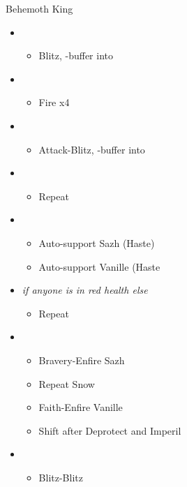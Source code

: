 \begin{battle}{Behemoth King}
\begin{itemize}
    \item \second
    \begin{itemize}
        \item Blitz, \rav-buffer into
    \end{itemize}
    \item \sixth
    \begin{itemize}
        \item Fire x4
    \end{itemize}
    \item \first
    \begin{itemize}
        \item Attack-Blitz, \rav-buffer into
    \end{itemize}
    \item \sixth
    \begin{itemize}
        \item Repeat
    \end{itemize}
    \item \fourth
    \begin{itemize}
        \item Auto-support Sazh (Haste)
        \item Auto-support Vanille (Haste
    \end{itemize}
    \item \fifth \textit{if anyone is in red health else} \sixth
    \begin{itemize}
        \item Repeat
    \end{itemize}
    \item \third
    \begin{itemize}
        \item Bravery-Enfire Sazh
        \item Repeat Snow
        \item Faith-Enfire Vanille
        \item Shift after Deprotect and Imperil
    \end{itemize}
    \item \second
    \begin{itemize}
        \item Blitz-Blitz
    \end{itemize}
\end{itemize}
\end{battle}


